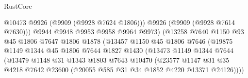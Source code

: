 \begin{lexlean}{RustCore}
\begin{coremodule}
                                            @10473
                                            @9926
                                            (@9909 (@9928 @7624 @1806)))
                                          @9926
                                          (@9909 (@9928 @7614 @7630)))
                                        @9944
                                        @9948
                                        @9953
                                        @9958
                                        @9964
                                        @9973)
                                      (@13258
                                        @7640
                                        @1150
                                        @93
                                        @45
                                        @1806
                                        @7647
                                        @1806
                                        @1878
                                        (@13457
                                          @1150
                                          @45
                                          @1806
                                          @7646
                                          (@19875
                                            @1149
                                            @1344
                                            @45
                                            @1806
                                            @7644
                                            @1827
                                            @1430
                                            (@13473
                                              @1149
                                              @1344
                                              @7644
                                              (@13479
                                                @1148
                                                @31
                                                @1343
                                                @1803
                                                @7643
                                                @10470
                                                (@23577
                                                  @1147
                                                  @31
                                                  @35
                                                  @4218
                                                  @7642
                                                  @23600
                                                  (@20055 @585 @31 @34 @1852 @4220 @13371 @24126))))

\end{coremodule}
\end{lexlean}
